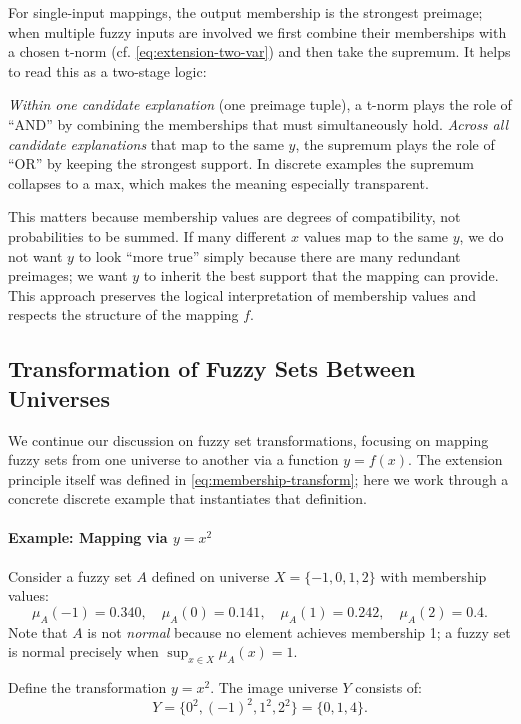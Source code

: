 For single\hyp{}input mappings, the output membership is the strongest preimage; when multiple fuzzy inputs are involved we first combine their memberships with a chosen t\hyp{}norm (cf. \eqref{eq:extension-two-var}) and then take the supremum. It helps to read this as a two\hyp{}stage logic:

\emph{Within one candidate explanation} (one preimage tuple), a t\hyp{}norm plays the role of ``AND'' by combining the memberships that must simultaneously hold. \emph{Across all candidate explanations} that map to the same \(y\), the supremum plays the role of ``OR'' by keeping the strongest support. In discrete examples the supremum collapses to a max, which makes the meaning especially transparent.

This matters because membership values are degrees of compatibility, not probabilities to be summed. If many different \(x\) values map to the same \(y\), we do not want \(y\) to look ``more true'' simply because there are many redundant preimages; we want \(y\) to inherit the best support that the mapping can provide. This approach preserves the logical interpretation of membership values and respects the structure of the mapping \( f \).

\subsection{Transformation of Fuzzy Sets Between Universes}
\label{sec:fuzzyrelations_transformation_of_fuzzy_sets_between_universes}

We continue our discussion on fuzzy set transformations, focusing on mapping fuzzy sets from one universe to another via a function \( y = f(x) \).
The extension principle itself was defined in \eqref{eq:membership-transform}; here we work through a concrete discrete example that instantiates that definition.

\paragraph{Example: Mapping via \( y = x^2 \)}

Consider a fuzzy set \( A \) defined on universe \( X = \{-1, 0, 1, 2\} \) with membership values:
\[
\mu_A(-1) = 0.340, \quad \mu_A(0) = 0.141, \quad \mu_A(1) = 0.242, \quad \mu_A(2) = 0.4.
\]
Note that \( A \) is not \emph{normal} because no element achieves membership 1; a fuzzy set is normal precisely when \(\sup_{x \in X} \mu_A(x) = 1\).

Define the transformation \( y = x^2 \). The image universe \( Y \) consists of:
\[
Y = \{0^2, (-1)^2, 1^2, 2^2\} = \{0, 1, 4\}.
\]

